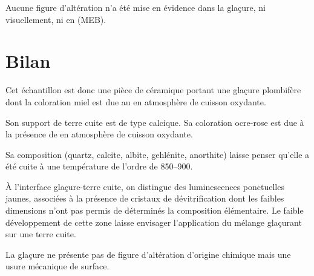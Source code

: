 Aucune figure d'altération n'a été mise en évidence dans la glaçure, 
ni visuellement, ni en \MEB[ie] (MEB).


\section{Bilan}

Cet échantillon est donc une pièce de céramique portant une glaçure 
plombifère dont la coloration miel est due au  en atmosphère 
de cuisson oxydante.

Son support de terre cuite est de type calcique. Sa coloration 
ocre-rose est due à la présence de  en atmosphère de 
cuisson oxydante.

Sa composition \cristallo (quartz, calcite, albite, gehlénite, anorthite) laisse penser qu'elle a été cuite à une température de l'ordre de \SIrange[range-phrase=\ à\ ]{850}{900}{\degC}.

À l'interface glaçure-terre cuite, on distingue des luminescences 
ponctuelles jaunes, associées à la présence de cristaux de 
dévitrification dont les faibles dimensions n'ont pas permis de 
déterminés la composition élémentaire. Le faible développement de 
cette zone laisse envisager l'application du mélange glaçurant sur 
une terre cuite.

La glaçure ne présente pas de figure d'altération d'origine chimique 
mais une usure mécanique de surface.
